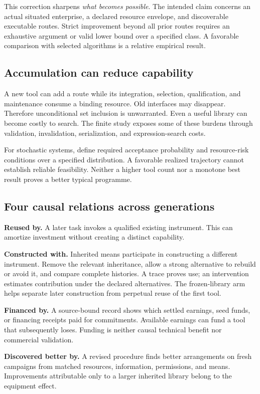 \documentclass[10pt,a4paper]{article}
\begin{document}
This correction sharpens \emph{what becomes possible}. The intended claim concerns an actual situated enterprise, a declared resource envelope, and discoverable executable routes. Strict improvement beyond all prior routes requires an exhaustive argument or valid lower bound over a specified class. A favorable comparison with selected algorithms is a relative empirical result.

\subsection{Accumulation can reduce capability}

A new tool can add a route while its integration, selection, qualification, and maintenance consume a binding resource. Old interfaces may disappear. Therefore unconditional set inclusion is unwarranted. Even a useful library can become costly to search. The finite study exposes some of these burdens through validation, invalidation, serialization, and expression-search costs.

For stochastic systems, define required acceptance probability and resource-risk conditions over a specified distribution. A favorable realized trajectory cannot establish reliable feasibility. Neither a higher tool count nor a monotone best result proves a better typical programme.

\subsection{Four causal relations across generations}

\textbf{Reused by.} A later task invokes a qualified existing instrument. This can amortize investment without creating a distinct capability.

\textbf{Constructed with.} Inherited means participate in constructing a different instrument. Remove the relevant inheritance, allow a strong alternative to rebuild or avoid it, and compare complete histories. A trace proves use; an intervention estimates contribution under the declared alternatives. The frozen-library arm helps separate later construction from perpetual reuse of the first tool.

\textbf{Financed by.} A source-bound record shows which settled earnings, seed funds, or financing receipts paid for commitments. Available earnings can fund a tool that subsequently loses. Funding is neither causal technical benefit nor commercial validation.

\textbf{Discovered better by.} A revised procedure finds better arrangements on fresh campaigns from matched resources, information, permissions, and means. Improvements attributable only to a larger inherited library belong to the equipment effect.
\end{document}
